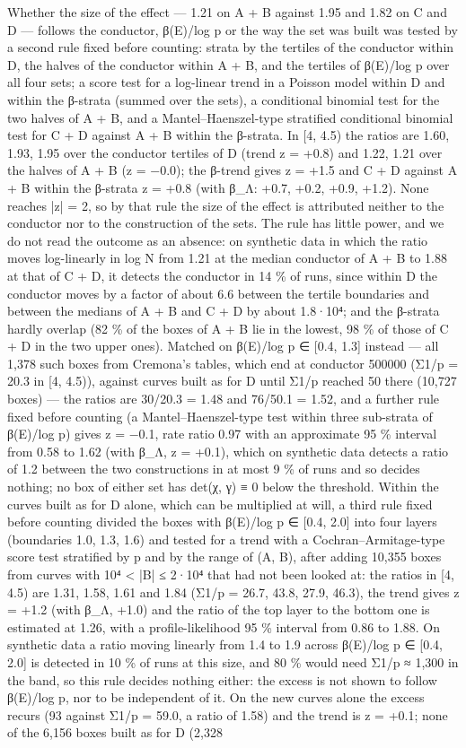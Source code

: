 \documentclass[11pt,a4paper]{article}
\theoremstyle{named}
\begin{document}
Whether the size of the effect — 1.21 on A + B against 1.95 and 1.82 on C and D — follows the conductor, β(E)/log p or the way the set was built was tested by a second rule fixed before counting: strata by the tertiles of the conductor within D, the halves of the conductor within A + B, and the tertiles of β(E)/log p over all four sets; a score test for a log-linear trend in a Poisson model within D and within the β-strata (summed over the sets), a conditional binomial test for the two halves of A + B, and a Mantel–Haenszel-type stratified conditional binomial test for C + D against A + B within the β-strata. In [4, 4.5) the ratios are 1.60, 1.93, 1.95 over the conductor tertiles of D (trend z = +0.8) and 1.22, 1.21 over the halves of A + B (z = −0.0); the β-trend gives z = +1.5 and C + D against A + B within the β-strata z = +0.8 (with β\_Λ: +0.7, +0.2, +0.9, +1.2). None reaches |z| = 2, so by that rule the size of the effect is attributed neither to the conductor nor to the construction of the sets. The rule has little power, and we do not read the outcome as an absence: on synthetic data in which the ratio moves log-linearly in log N from 1.21 at the median conductor of A + B to 1.88 at that of C + D, it detects the conductor in 14 \% of runs, since within D the conductor moves by a factor of about 6.6 between the tertile boundaries and between the medians of A + B and C + D by about 1.8·10⁴; and the β-strata hardly overlap (82 \% of the boxes of A + B lie in the lowest, 98 \% of those of C + D in the two upper ones). Matched on β(E)/log p ∈ [0.4, 1.3] instead — all 1,378 such boxes from Cremona's tables, which end at conductor 500000 (Σ1/p = 20.3 in [4, 4.5)), against curves built as for D until Σ1/p reached 50 there (10,727 boxes) — the ratios are 30/20.3 = 1.48 and 76/50.1 = 1.52, and a further rule fixed before counting (a Mantel–Haenszel-type test within three sub-strata of β(E)/log p) gives z = −0.1, rate ratio 0.97 with an approximate 95 \% interval from 0.58 to 1.62 (with β\_Λ, z = +0.1), which on synthetic data detects a ratio of 1.2 between the two constructions in at most 9 \% of runs and so decides nothing; no box of either set has det(χ, γ) ≡ 0 below the threshold. Within the curves built as for D alone, which can be multiplied at will, a third rule fixed before counting divided the boxes with β(E)/log p ∈ [0.4, 2.0] into four layers (boundaries 1.0, 1.3, 1.6) and tested for a trend with a Cochran–Armitage-type score test stratified by p and by the range of (A, B), after adding 10,355 boxes from curves with 10⁴ \textless{} |B| ≤ 2·10⁴ that had not been looked at: the ratios in [4, 4.5) are 1.31, 1.58, 1.61 and 1.84 (Σ1/p = 26.7, 43.8, 27.9, 46.3), the trend gives z = +1.2 (with β\_Λ, +1.0) and the ratio of the top layer to the bottom one is estimated at 1.26, with a profile-likelihood 95 \% interval from 0.86 to 1.88. On synthetic data a ratio moving linearly from 1.4 to 1.9 across β(E)/log p ∈ [0.4, 2.0] is detected in 10 \% of runs at this size, and 80 \% would need Σ1/p ≈ 1,300 in the band, so this rule decides nothing either: the excess is not shown to follow β(E)/log p, nor to be independent of it. On the new curves alone the excess recurs (93 against Σ1/p = 59.0, a ratio of 1.58) and the trend is z = +0.1; none of the 6,156 boxes built as for D (2,328 
\end{document}
